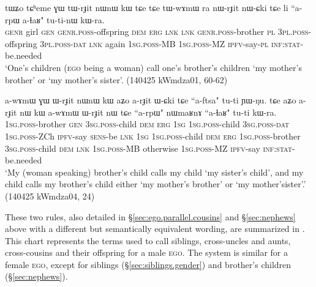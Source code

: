  \begin{exe}
\ex \label{ex:MBCh.2}
\gll tɯʑo tɕʰeme ɣɯ tɯ-rɟit nɯnɯ kɯ tɕe tɕe tɯ-wɤmɯ ra nɯ-rɟit nɯ-ɕki tɕe li ``a-rpɯ a-ɬaʁ"  tu-ti-nɯ kɯ-ra. \\
\textsc{genr} girl \textsc{gen} \textsc{genr}.\textsc{poss}-offspring \textsc{dem} \textsc{erg} \textsc{lnk} \textsc{lnk} \textsc{genr}.\textsc{poss}-brother \textsc{pl}  \textsc{3pl}.\textsc{poss}-offspring  \textsc{3pl}.\textsc{poss}-\textsc{dat} \textsc{lnk} again \textsc{1sg}.\textsc{poss}-MB \textsc{1sg}.\textsc{poss}-MZ \textsc{ipfv}-say-\textsc{pl} \textsc{inf}:\textsc{stat}-be.needed \\
\glt `One's children (\textsc{ego} being a woman) call one's brother's children  `my mother's brother' or  `my mother's sister'. (140425 kWmdza01, 60-62)
\end{exe}

\begin{exe}
\ex \label{ex:FZCh.2}
\gll a-wɤmɯ ɣɯ ɯ-rɟit nɯnɯ kɯ aʑo a-rɟit ɯ-ɕki tɕe ``a-ftsa" tu-ti ɲɯ-ŋu.  tɕe aʑo a-rɟit nɯ kɯ a-wɤmɯ ɯ-rɟit nɯ tɕe ``a-rpɯ" nɯmaʁnɤ ``a-ɬaʁ" tu-ti kɯ-ra. \\
\textsc{1sg}.\textsc{poss}-brother \textsc{gen} \textsc{3sg}.\textsc{poss}-child \textsc{dem} \textsc{erg} \textsc{1sg} \textsc{1sg}.\textsc{poss}-child \textsc{3sg}.\textsc{poss}-\textsc{dat} \textsc{1sg}.\textsc{poss}-ZCh \textsc{ipfv}-say \textsc{sens}-be  \textsc{lnk} \textsc{1sg} \textsc{1sg}.\textsc{poss}-child \textsc{dem} \textsc{erg} \textsc{1sg}.\textsc{poss}-brother \textsc{3sg}.\textsc{poss}-child \textsc{dem} \textsc{lnk} \textsc{1sg}.\textsc{poss}-MB otherwise \textsc{1sg}.\textsc{poss}-MZ \textsc{ipfv}-say \textsc{inf}:\textsc{stat}-be.needed  \\
\glt `My (woman speaking) brother's child calls my child  `my sister's child', and my child  calls my brother's child either  `my mother's brother' or  `my mother'sister'.'  (140425 kWmdza04, 24)
\end{exe}

These two rules, also detailed in §\ref{sec:ego.parallel.cousins} and §\ref{sec:nephews} above with a different but semantically equivalent wording, are summarized in . This chart represents the terms used to call siblings, cross-uncles and aunts, cross-cousins and their offspring for a male \textsc{ego}. The system is similar for a female \textsc{ego}, except for  siblings (§\ref{sec:siblings.gender}) and brother's children (§\ref{sec:nephews}).


